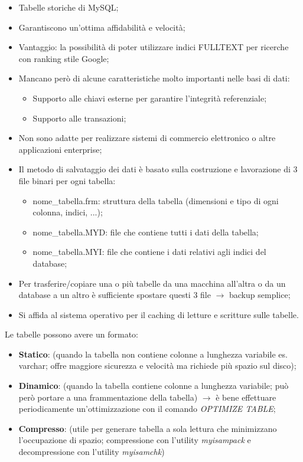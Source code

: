 \begin{itemize}

\item Tabelle storiche di MySQL;
\item Garantiscono un’ottima affidabilità e velocità;
\item Vantaggio: la possibilità di poter utilizzare indici FULLTEXT per ricerche con ranking stile Google;
\item Mancano però di alcune caratteristiche molto importanti nelle basi di dati:

\begin{itemize}
\item Supporto alle chiavi esterne per garantire l’integrità referenziale;
\item Supporto alle transazioni;
\end{itemize}

\item Non sono adatte per realizzare sistemi di commercio elettronico o altre applicazioni enterprise;
\item Il metodo di salvataggio dei dati è basato sulla costruzione e lavorazione di 3 file binari per ogni tabella:

\begin{itemize}
\item nome\_tabella.frm: struttura della tabella (dimensioni e tipo di ogni colonna, indici, ...);
\item nome\_tabella.MYD: file che contiene tutti i dati della tabella;
\item nome\_tabella.MYI: file che contiene i dati relativi agli indici del database;
\end{itemize}

\item Per trasferire/copiare una o più tabelle da una macchina all’altra o da un database a un altro è sufficiente spostare questi 3 file $\rightarrow$ backup semplice;
\item Si affida al sistema operativo per il caching di letture e scritture sulle tabelle.

\end{itemize}

Le tabelle possono avere un formato:

\begin{itemize}

\item{\textbf{Statico}}: (quando la tabella non contiene colonne a lunghezza variabile es. varchar; offre maggiore sicurezza e velocità ma richiede più spazio sul disco);
\item{\textbf{Dinamico}}: (quando la tabella contiene colonne a lunghezza variabile; può però portare a una frammentazione della tabella) $\rightarrow$ è bene effettuare periodicamente un’ottimizzazione con il comando \textit{OPTIMIZE TABLE};
\item{\textbf{Compresso}}:  (utile per generare tabella a sola lettura che minimizzano l’occupazione di spazio; compressione con l’utility \textit{myisampack} e decompressione con l’utility \textit{myisamchk})

\end{itemize}

